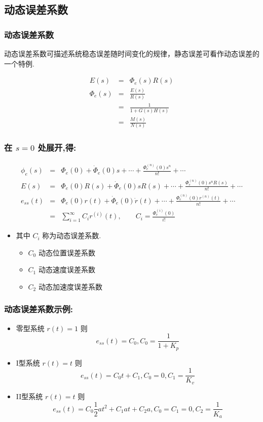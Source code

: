 \documentclass{article}
\begin{document}
\subsection{动态误差系数}
\label{sec-3-3}
\begin{frame}
\frametitle{动态误差系数}
\label{sec-3-3-1}

动态误差系数可描述系统稳态误差随时间变化的规律，静态误差可看作动态误差的一个特例.

\begin{eqnarray*}
E(s) & = & \Phi_e(s)R(s)\\
\Phi_e(s) &=& \frac{E(s)}{R(s)}\\
         &=&\frac{1}{1+G(s)H(s)} \\
         &=& \frac{M(s)}{N(s)} 
\end{eqnarray*}
\end{frame}
\begin{frame}
\frametitle{在 $s=0$ 处展开,得:}
\label{sec-3-3-2}


\begin{eqnarray*}
\phi_e(s)  &=& \Phi_e(0)+\dot{\Phi}_e(0)s+\cdots+\frac{\Phi_e^{(n)}(0)s^n}{n!}+\cdots \\
E(s) & = & \Phi_e(0)R(s)+\dot{\Phi}_e(0)sR(s)+\cdots+\frac{\Phi_e^{(n)}(0)s^nR(s)}{n!}+\cdots \\
e_{ss}(t) & = & \Phi_e(0)r(t)+\dot{\Phi}_e(0)\dot{r}(t)+\cdots+\frac{\Phi_e^{(n)}(0)r^{(n)}(t)}{n!}+\cdots \\
          &= & \sum_{i=1}^{\infty}C_ir^{(i)}(t) ,\qquad
C_i = \frac{\Phi_e^{(i)}(0)}{i!}
\end{eqnarray*}

\begin{itemize}
\item 其中 $C_i$ 称为动态误差系数.
\begin{itemize}
\item $C_0$ 动态位置误差系数
\item $C_1$ 动态速度误差系数
\item $C_2$ 动态加速度误差系数
\end{itemize}
\end{itemize}
\end{frame}
\begin{frame}
\frametitle{动态误差系数示例:}
\label{sec-3-3-3}

\begin{itemize}
\item <2-> 零型系统 $r(t)=1$ 则 \[e_{ss}(t)=C_0 ,C_0=\frac{1}{1+K_p}\]
\item <3-> I型系统 $r(t)=t$ 则 \[e_{ss}(t)=C_0 t+C_1,C_0=0,C_1=\frac{1}{K_v}\]
\item <4-> II型系统 $r(t)=t$ 则 \[e_{ss}(t)=C_0 \frac{1}{2}at^2+C_1at+C_2 a,C_0=C_1=0,C_2=\frac{1}{K_a}\]
\end{itemize}
\end{frame}
\end{document}
